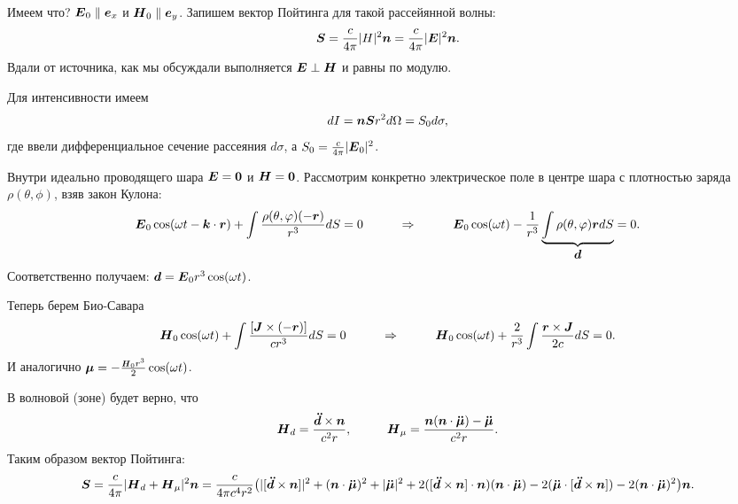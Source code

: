
Имеем что? $\mbox{\boldmath $E$}_0 \parallel \mbox{\boldmath $e$}_x$ и $\mbox{\boldmath $H$}_0 \parallel \mbox{\boldmath $e$}_y$. Запишем вектор Пойтинга для такой рассейянной волны:
\begin{equation*}
    \mbox{\boldmath $S$} = \frac{c}{4 \pi} |H|^2 \mbox{\boldmath $n$} = \frac{c}{4 \pi} |\mbox{\boldmath $E$}|^2 \mbox{\boldmath $n$}.
\end{equation*}
Вдали от источника, как мы обсуждали выполняется $\mbox{\boldmath $E$} \perp \mbox{\boldmath $H$}$ и равны по модулю.

Для интенсивности имеем
\begin{equation*}
    d I = \mbox{\boldmath $n$} \mbox{\boldmath $S$} r^2 d \Omega = S_0 d \sigma,
\end{equation*}
где ввели дифференциальное сечение рассеяния $d \sigma$, а $S_0 = \frac{c}{4 \pi} |\mbox{\boldmath $E$}_0|^2$.

Внутри идеально проводящего шара $\mbox{\boldmath $E$} = \mbox{\boldmath $0$}$ и $\mbox{\boldmath $H$} = \mbox{\boldmath $0$}$.
Рассмотрим конкретно электрическое поле в центре шара с плотностью заряда $\rho(\theta,\phi)$, взяв закон Кулона:
\begin{equation*}
    \mbox{\boldmath $E$}_0 \cos (\omega t - \mbox{\boldmath $k$} \cdot \mbox{\boldmath $r$}) + \int \frac{\rho (\theta,\varphi) (-  \mbox{\boldmath $r$})}{r^3}d S = 0
    \hspace{1 cm}
    \Rightarrow
    \hspace{1 cm}
    \mbox{\boldmath $E$}_0 \cos (\omega t) - \frac{1}{r^3} \underbrace{\int \rho(\theta,\varphi) \mbox{\boldmath $r$} d S}_{\mbox{\boldmath $d$}} = 0.
\end{equation*}
Соответственно получаем: $\mbox{\boldmath $d$} = \mbox{\boldmath $E$}_0 r^3 \cos (\omega t)$.

Теперь берем Био-Савара
\begin{equation*}
    \mbox{\boldmath $H$}_0 \cos (\omega t) + \int \frac{[\mbox{\boldmath $J$} \times (- \mbox{\boldmath $r$})]}{c r^3} dS = 0
    \hspace{1 cm}
    \Rightarrow
    \hspace{1 cm}
    \mbox{\boldmath $H$}_0 \cos (\omega t) + \frac{2}{r^3} \int \frac{\mbox{\boldmath $r$} \times \mbox{\boldmath $J$}}{2 c} d S = 0.
\end{equation*}
И аналогично $\vc{\mu} = - \frac{\smallvc{H}_0 r^3}{2} \cos (\omega t)$.

В волновой (зоне) будет верно, что
\begin{equation*}
    \mbox{\boldmath $H$}_d = \frac{\mbox{\boldmath $\ddot{d}$} \times \mbox{\boldmath $n$}}{c^2 r},
    \hspace{1 cm}
    \mbox{\boldmath $H$}_\mu = \frac{\mbox{\boldmath $n$} (\mbox{\boldmath $n$} \cdot \mbox{\boldmath $\ddot{\mu}$}) - \mbox{\boldmath $\ddot{\mu}$}}{c^2 r}.
\end{equation*}
Таким образом вектор Пойтинга:
\begin{equation*}
    \mbox{\boldmath $S$} = \frac{c}{4 \pi} |\mbox{\boldmath $H$}_d + \mbox{\boldmath $H$}_\mu|^2 \mbox{\boldmath $n$}
    =
    \frac{c}{4 \pi c^4 r^2} \big( |[\mbox{\boldmath $\ddot{d}$} \times \mbox{\boldmath $n$}]|^2 + (\mbox{\boldmath $n$} \cdot \mbox{\boldmath $\ddot{\mu}$})^2 + |\mbox{\boldmath $\ddot{\mu}$}|^2 + 2 ([\mbox{\boldmath $\ddot{d}$} \times \mbox{\boldmath $n$}] \cdot \mbox{\boldmath $n$}) (\mbox{\boldmath $n$} \cdot \mbox{\boldmath $\ddot{\mu}$}) - 2 (\mbox{\boldmath $\ddot{\mu}$} \cdot [\mbox{\boldmath $\ddot{d}$} \times \mbox{\boldmath $n$}]) - 2 (\mbox{\boldmath $n$} \cdot \mbox{\boldmath $\ddot{\mu}$})^2 \big) \mbox{\boldmath $n$}.
\end{equation*}

